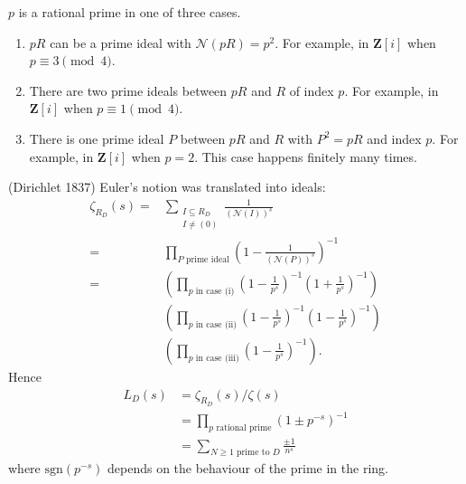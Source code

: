\documentclass[11pt, oneside]{amsart}
\numberwithin{equation}{section}
\numberwithin{theorem}{section}
\theoremstyle{definition}
\def\Z{\mathbf{Z}}
\def\N{\mathcal{N}}
\begin{document}
{$p$ is a rational prime in one of three cases. 
\begin{enumerate}[label=(\roman*)]
\item $pR$ can be a prime ideal with $\N(pR)=p^2$. For example, in $\Z[i]$ when $p\equiv 3\pmod 4$.
\item There are two prime ideals between $pR$ and $R$ of index $p$. For example, in $\Z[i]$ when $p\equiv 1\pmod 4$.
\item There is one prime ideal $P$ between $pR$ and $R$ with $P^2=pR$ and index $p$. For example, in $\Z[i]$ when $p =2$. This case happens finitely many times.
\end{enumerate}

(Dirichlet 1837) Euler's notion was translated into ideals:
\begin{align*}
\zeta_{R_D}(s) 	=& \sum_{\substack{I\subseteq R_D\\I\neq(0)}} \frac{1}{(\N(I))^s} \\
			=& \prod_{P \textrm{ prime ideal}} \left(1-\frac{1}{(\N(P))^s}   \right)^{-1}\\
			=& \left(\prod_{p \textrm{ in case (i)}} \left(1-\frac{1}{p^s}   \right)^{-1}\left(1+\frac{1}{p^s} \right)^{-1}\right) \\
			&\left(\prod_{p \textrm{ in case (ii)}} \left(1-\frac{1}{p^s}   \right)^{-1}\left(1-\frac{1}{p^s}   \right)^{-1} \right)\\
			&\left( \prod_{p \textrm{ in case (iii)}} \left(1-\frac{1}{p^s}   \right)^{-1}\right).
\end{align*}
Hence
\begin{align*}
L_D(s) 	&= \zeta_{R_D}(s)/\zeta(s)\\
		&= \prod_{p \textrm{ rational prime}} (1\pm p^{-s})^{-1}\\
		&= \sum_{N\geqslant 1\textrm{ prime to } D} \frac{\pm 1}{n^s}
\end{align*}
where $\mathrm{sgn}(p^{-s})$ depends on the behaviour of the prime in the ring.

}
\end{document}
